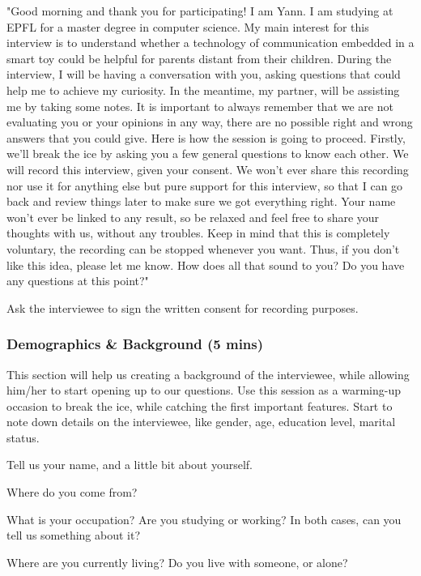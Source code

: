 "Good morning and thank you for participating! I am Yann. I am studying at EPFL for a master degree in computer science. My main interest for this interview is to understand whether  a  technology  of  communication embedded in a smart toy could be helpful for parents distant from their children. During the interview, I will be having a conversation with you, asking questions that could help me to achieve my curiosity. In the meantime, my partner, will be assisting me by taking some notes. It is important to always remember that we are not evaluating you or your opinions in any way, there are no possible right and wrong answers that you could give. 
Here is how the session is going to proceed. Firstly, we'll break the ice by asking you a few general questions to know each other. We will record this interview, given your consent. We won't ever share this recording nor use it for anything else but pure support for this interview, so that I can go back and review things later to make sure we got everything right. Your name won't ever be linked to any result, so be relaxed and feel free to share your thoughts with us, without any troubles. Keep in mind that this is completely voluntary, the recording can be stopped whenever you want. Thus, if you don't like this idea, please let me know. 
How does all that sound to you? Do you have any questions at this point?"

\begin{todolist}
    \item Ask the interviewee to sign the written consent for recording purposes.
\end{todolist}

\vspace{2pt}
\subsubsection{Demographics \& Background (5 mins)}

This section will help us creating a background of the interviewee, while allowing him/her to start opening up to our questions. Use this session as a warming-up occasion to break the ice, while catching the first important features. Start to note down details on the interviewee, like gender, age, education level, marital status.

\begin{todolist}
    \item Tell us your name, and a little bit about yourself.
    \item Where do you come from?
    \item What is your occupation? Are you studying or working? In both cases, can you tell us something about it?
    \item Where are you currently living? Do you live with someone, or alone? 
\end{todolist}

